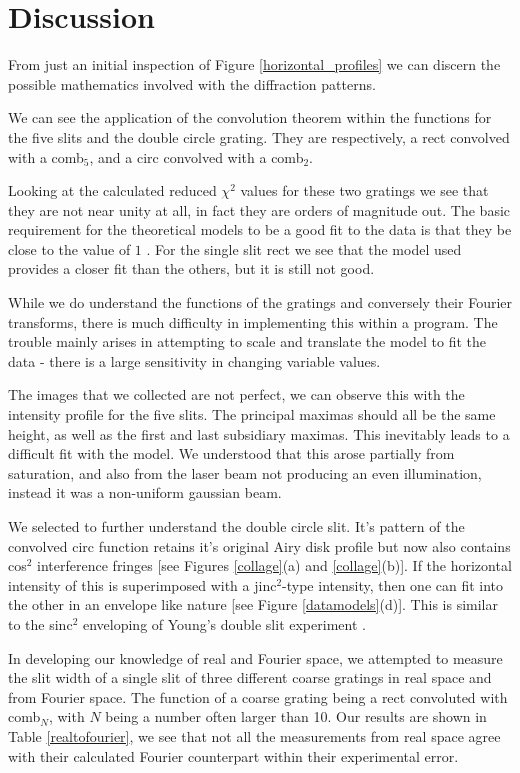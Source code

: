 \documentclass[twocolumn]{revtex4}
\begin{document}
\vspace{-3ex}
\section{Discussion}
\vspace{-2ex}
From just an initial inspection of Figure \ref{horizontal_profiles} we can discern the possible mathematics involved with the diffraction patterns.

We can see the application of the convolution theorem within the functions for the five slits and the double circle grating. They are respectively, a rect convolved with a comb$_5$, and a circ convolved with a comb$_2$. 

Looking at the calculated reduced $\chi^2$ values for these two gratings we see that they are not near unity at all, in fact they are orders of magnitude out. The basic requirement for the theoretical models to be a good fit to the data  is that they be close to the value of $1$ \cite{hughesandhayes}. For the single slit rect we see that the model used provides a closer fit than the others, but it is still not good.

While we do understand the functions of the gratings and conversely their Fourier transforms, there is much difficulty in implementing this within a program. The trouble mainly arises in attempting to scale and translate the model to fit the data - there is a large sensitivity in changing variable values.

The images that we collected are not perfect, we can observe this with the intensity profile for the five slits. The principal maximas should all be the same height, as well as the first and last subsidiary maximas. This inevitably leads to a difficult fit with the model. We understood that this arose partially from saturation, and also from the laser beam not producing an even illumination, instead it was a non-uniform gaussian beam.

We selected to further understand the double circle slit. It's pattern of the convolved circ function retains it's original Airy disk profile but now also contains cos$^2$ interference fringes [see Figures \ref{collage}(a) and \ref{collage}(b)]. If the horizontal intensity of this is superimposed with a jinc$^2$-type intensity, then one can fit into the other in an envelope like nature [see Figure \ref{datamodels}(d)]. This is similar to the sinc$^2$ enveloping of Young's double slit experiment \cite{of2f}.

In developing our knowledge of real and Fourier space, we attempted to measure the slit width of a single slit of three different coarse gratings in real space and from Fourier space. The function of a coarse grating being a rect convoluted with comb$_N$, with $N$ being a number often larger than 10. Our results are shown in Table \ref{realtofourier}, we see that not all the measurements from real space agree with their calculated Fourier counterpart within their experimental error.
\end{document}
